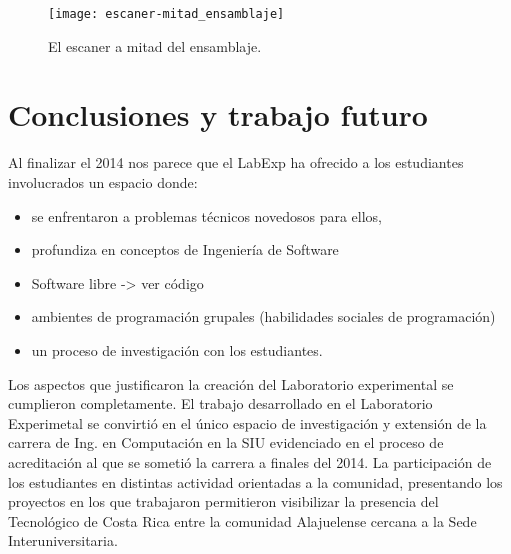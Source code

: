 \documentclass[conference]{IEEEtran}
\begin{document}
\begin{figure}[!t]
\centering
\texttt{[image: escaner-mitad\_ensamblaje]}
\caption{El escaner a mitad del ensamblaje.}
\label{escaner}
\end{figure}





\section{Conclusiones y trabajo futuro}

Al finalizar el 2014 nos parece que el LabExp ha ofrecido a los estudiantes involucrados un espacio donde:

\begin{itemize}

\item se enfrentaron a problemas técnicos novedosos para ellos, 

\item profundiza en conceptos de Ingeniería de Software

\item Software libre -> ver código

\item ambientes de programación grupales (habilidades sociales de programación)

\item un proceso de investigación con los estudiantes.

\end{itemize}

Los aspectos que justificaron la creación del Laboratorio experimental se cumplieron completamente. El trabajo desarrollado en el Laboratorio Experimetal se convirtió en el único espacio de investigación y extensión de la carrera de Ing. en Computación en la SIU evidenciado en el proceso de acreditación al que se sometió la carrera a finales del 2014. La participación de los estudiantes en distintas actividad orientadas a la comunidad, presentando los proyectos en los que trabajaron permitieron visibilizar la presencia del Tecnológico de Costa Rica entre la comunidad Alajuelense cercana a la Sede Interuniversitaria. 
\end{document}
